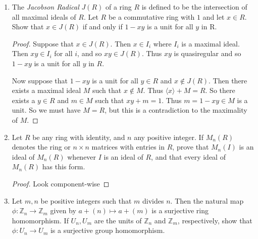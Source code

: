 \documentclass{article}
\theoremstyle{definition}
\begin{document}
\begin{enumerate}
\begin{proof}
                If $b=0$, then we are done since $I$ is an ideal, and must contain zero. Now suppose $b\neq 0$. Then there is an inverse $b^{-1}\in F$ and so $ab^{-1}\in F$. Thus either $ab^{-1}\in R$ or $ba^{-1}\in R$. If $ab^{-1}\in R$, then $a=ab^{-1}b\in J$, a contradiction. 
                
                Thus it must be the case that $ba^{-1}\in R$, and so $b=ba^{-1}a\in I$. Therefore $b\in I$ and $J\subseteq I$, as desired. 
            \end{proof}

            \item The \textit{Jacobson Radical} $J(R)$ of a ring $R$ is defined to be the intersection of all maximal ideals of $R$. Let $R$ be a commutative ring with $1$ and let $x\in R$. Show that $x\in J(R)$ if and only if $1-xy$ is a unit for all $y$ in R.
            
            \begin{proof}
                Suppose that $x\in J(R)$. Then $x\in I_i$ where $I_i$ is a maximal ideal. Then $xy\in I_i$ for all $i$, and so $xy\in J(R)$. Thus $xy$ is quasiregular and so $1-xy$ is a unit for all $y$ in $R$.

                Now suppose that $1-xy$ is a unit for all $y\in R$ and $x\notin J(R)$. Then there exists a maximal ideal $M$ such that $x\notin M$. Thus $\langle x \rangle +M=R$. So there exists a $y\in R$ and $m\in M$ such that $xy+m=1$. Thus $m=1-xy\in M$ is a unit. So we must have $M=R$, but this is a contradiction to the maximality of $M$.
            \end{proof}

            \item Let $R$ be any ring with identity, and $n$ any positive integer. If $M_n(R)$ denotes the ring or $n\times n$ matrices with entries in $R$, prove that $M_n(I)$ is an ideal of $M_n(R)$ whenever $I$ is an ideal of $R$, and that every ideal of $M_n(R)$ has this form.
            
            \begin{proof}
                Look component-wise
            \end{proof}

            \item Let $m,n$ be positive integers such that $m$ divides $n$. Then the natural map $\phi:\mathbb{Z}_n \to \mathbb{Z}_m$ given by $a+(n) \mapsto a+(m)$ is a surjective ring homomorphism. If $U_n,U_m$ are the units of $\mathbb{Z}_n$ and $\mathbb{Z}_m$, respectively, show that $\phi:U_n\to U_m$ is a surjective group homomorphism.
            

\end{enumerate}
\end{document}
